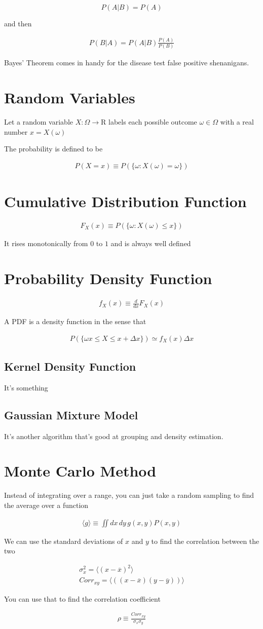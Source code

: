 \documentclass[fleqn]{report}
\newcommand{\equations} [1] {
\begin{gather*}
#1
\end{gather*}
}
\begin{document}
\[ 
P(A | B) = P(A) 
\]

and then 
\equations{
    P(B | A) = P(A | B) \frac{P(A)}{P(B)}
}

Bayes' Theorem comes in handy for the disease test false positive shenanigans. 

\section{Random Variables}
Let a random variable $X: \Omega \to \mathrm{R}$ labels 
each possible outcome $\omega \in \Omega$ with a real number $x = X(\omega)$

The probability is defined to be 
\equations{
    P(X = x) \equiv P(\{ \omega: X(\omega) = \omega \})
}

\section{Cumulative Distribution Function}
\equations{
    F_X(x)
    \equiv 
    P(\{
    \omega: X(\omega) \leq x    
    \})
}
It rises monotonically from $0$ to $1$ and is always well defined

\section{Probability Density Function}
\equations{
    f_X(x) \equiv 
    \frac{d}{dx} F_X(x)
}

A PDF is a density function in the sense that 
\equations{
    P(\{ \omega x \leq X \leq x + \Delta x \}) 
    \simeq 
    f_X(x) \Delta x
}

\subsection{Kernel Density Function}
It's something 

\subsection{Gaussian Mixture Model}
It's another algorithm that's good at grouping and density estimation. 

\section{Monte Carlo Method}
Instead of integrating over a range, you can just take a random 
sampling to find the average over a function 
\equations{
    \langle g \rangle 
    \equiv 
    \iint 
    dx \, dy \, 
    g(x, y) P(x, y)
}
We can use the standard deviations of $x$ and $y$ to find 
the correlation between the two 
\equations{
    \sigma_x^2 = \langle (x - \overline{x})^2 \rangle 
    \\
    Corr_{xy} = \langle ((x - \overline{x})(y - \overline{y})) \rangle 
}
You can use that to find the correlation coefficient 
\equations{
    \rho 
    \equiv 
    \frac{Corr_{xy}}{\sigma_x \sigma_y}
}
\end{document}
